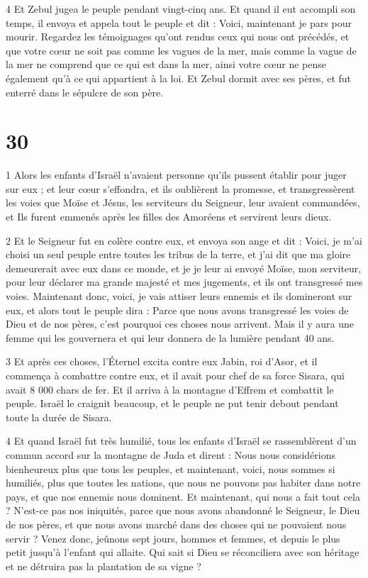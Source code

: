 \par 4 Et Zebul jugea le peuple pendant vingt-cinq ans. Et quand il eut accompli son temps, il envoya et appela tout le peuple et dit : Voici, maintenant je pars pour mourir. Regardez les témoignages qu'ont rendus ceux qui nous ont précédés, et que votre cœur ne soit pas comme les vagues de la mer, mais comme la vague de la mer ne comprend que ce qui est dans la mer, ainsi votre cœur ne pense également qu’à ce qui appartient à la loi. Et Zebul dormit avec ses pères, et fut enterré dans le sépulcre de son père.

\chapter{30}

\par 1 Alors les enfants d'Israël n'avaient personne qu'ils pussent établir pour juger sur eux ; et leur cœur s'effondra, et ils oublièrent la promesse, et transgressèrent les voies que Moïse et Jésus, les serviteurs du Seigneur, leur avaient commandées, et Ils furent emmenés après les filles des Amoréens et servirent leurs dieux.

\par 2 Et le Seigneur fut en colère contre eux, et envoya son ange et dit : Voici, je m'ai choisi un seul peuple entre toutes les tribus de la terre, et j'ai dit que ma gloire demeurerait avec eux dans ce monde, et je je leur ai envoyé Moïse, mon serviteur, pour leur déclarer ma grande majesté et mes jugements, et ils ont transgressé mes voies. Maintenant donc, voici, je vais attiser leurs ennemis et ils domineront sur eux, et alors tout le peuple dira : Parce que nous avons transgressé les voies de Dieu et de nos pères, c'est pourquoi ces choses nous arrivent. Mais il y aura une femme qui les gouvernera et qui leur donnera de la lumière pendant 40 ans.

\par 3 Et après ces choses, l'Éternel excita contre eux Jabin, roi d'Asor, et il commença à combattre contre eux, et il avait pour chef de sa force Sisara, qui avait 8 000 chars de fer. Et il arriva à la montagne d'Effrem et combattit le peuple. Israël le craignit beaucoup, et le peuple ne put tenir debout pendant toute la durée de Sisara.

\par 4 Et quand Israël fut très humilié, tous les enfants d'Israël se rassemblèrent d'un commun accord sur la montagne de Juda et dirent : Nous nous considérions bienheureux plus que tous les peuples, et maintenant, voici, nous sommes si humiliés, plus que toutes les nations, que nous ne pouvons pas habiter dans notre pays, et que nos ennemis nous dominent. Et maintenant, qui nous a fait tout cela ? N'est-ce pas nos iniquités, parce que nous avons abandonné le Seigneur, le Dieu de nos pères, et que nous avons marché dans des choses qui ne pouvaient nous servir ? Venez donc, jeûnons sept jours, hommes et femmes, et depuis le plus petit jusqu'à l'enfant qui allaite. Qui sait si Dieu se réconciliera avec son héritage et ne détruira pas la plantation de sa vigne ?

